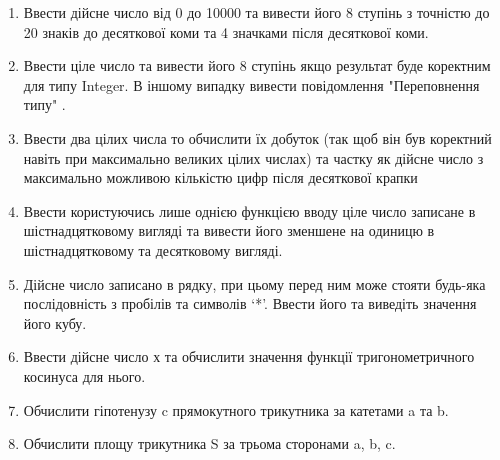 \documentclass[]{article}
\begin{document}
\begin{enumerate}
\item
Ввести дійсне число від 0 до 10000 та вивести його 8 ступінь з точністю
до 20 знаків до десяткової коми та 4 значками після десяткової коми.

\item
Ввести ціле число та вивести його 8 ступінь якщо результат буде коректним 
для типу Integer. В іншому випадку вивести повідомлення "Переповнення типу" .

\item 
Ввести два цілих числа то обчислити їх добуток (так щоб він був коректний навіть при максимально великих цілих числах) 
та частку як дійсне число з максимально можливою кількістю цифр після десяткової крапки

\item
Ввести користуючись лише однією функцією вводу ціле число записане в
шістнадцятковому вигляді та вивести його зменшене на одиницю в
шістнадцятковому та десятковому вигляді.
\item
Дійсне число записано в рядку, при цьому перед ним може стояти будь-яка
послідовність з пробілів та символів `*'. Ввести його та виведіть значення його кубу.

\item
Ввести дійсне число х та обчислити значення функції тригонометричного
косинуса для нього.
\item
Обчислити гіпотенузу c прямокутного трикутника за катетами a та b.
\item
Обчислити площу трикутника S за трьома сторонами a, b, c.


\end{enumerate}
\end{document}
